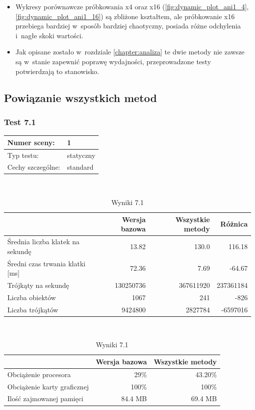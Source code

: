 \documentclass[a4paper,twoside,12pt]{book}
\begin{document}
\begin{itemize}
    \item Wykresy porównawcze próbkowania x4 oraz x16 (\ref{fig:dynamic_plot_ani1_4}, \ref{fig:dynamic_plot_ani1_16}) są zbliżone kształtem, ale próbkowanie x16 przebiega bardziej w~sposób bardziej chaotyczny, posiada różne odchylenia i~nagłe skoki wartości.
    \item Jak opisane zostało w~rozdziale \ref{chapter:analiza} te dwie metody nie zawsze są w~stanie zapewnić poprawę wydajności, przeprowadzone testy potwierdzają to stanowisko.
\end{itemize}


\subsection{Powiązanie wszystkich metod}
\subsubsection{Test 7.1}
\begin{tabular}{|l||l|}
\hline
Numer sceny: & 1 \\
\hline
Typ testu: & statyczny \\
\hline
Cechy szczególne: & standard \\
\hline
\end{tabular}\\

\vbox{}

\begin{table}[H]
    \centering
    \caption{Wyniki 7.1}
    \label{tab:all_test1}
    \begin{tabular}{|l||r|r|r|}
        \hline
        & Wersja bazowa & Wszystkie metody & Różnica \\
        \hline
        Średnia liczba klatek na sekundę & 13.82 & 130.0 & 116.18 \\
        \hline
        Średni czas trwania klatki [ms] & 72.36 & 7.69 & -64.67 \\
        \hline
        Trójkąty na sekundę & 130250736 & 367611920 & 237361184 \\
        \hline
        Liczba obiektów & 1067 & 241 & -826 \\
        \hline
        Liczba trójkątów & 9424800 & 2827784 & -6597016 \\
        \hline
    \end{tabular} \\
    
    \vspace*{0.5 cm}
    
    \begin{tabular}{|l||r|r|}
         \hline
        & Wersja bazowa & Wszystkie metody \\
         \hline
        Obciążenie procesora & 29\% & 43.20\% \\
        \hline
        Obciążenie karty graficznej & 100\% & 100\% \\
        \hline
        Ilość zajmowanej pamięci & 84.4 MB & 69.4 MB \\
        \hline
    \end{tabular}
\end{table}
\end{document}
